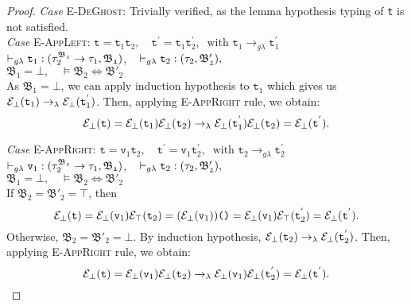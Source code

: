 \begin{proof}
\noindent\textit{Case} \textsc{E-DeGhost}:  \qquad  Trivially verified,
as the lemma hypothesis typing of \texttt{t} is not satisfied.\\

\noindent\textit{Case} \textsc{E-AppLeft}: \qquad 
 $\texttt{t} = \texttt{t}_{1} \texttt{t}_{2},\quad
 \texttt{t}^{'} = \texttt{t}_{1} \texttt{t}^{'}_{2}, ~ \text{ with }
 \texttt{t}_{1} \rightarrow_{g\lambda} \texttt{t}^{'}_{1}$ \\
$\vdash_{g\lambda} \texttt{t}_{1} : (\tau_{2}^{\mathfrak{B_{2}}} \rightarrow \tau_{1}, \mathfrak{B_{1}})$,  ~
$\vdash_{g\lambda} \texttt{t}_{2} : (\tau_{2}, \mathfrak{B'_{2}}), $ \\ 
$ \mathfrak{B_{1}} = \bot,  \quad 
\vDash\mathfrak{B_{2}} \Leftrightarrow \mathfrak{B'_{2}} $ \\

As $\mathfrak{B_{1}} = \bot$, we can apply induction hypothesis to
$\texttt{t}_{1}$ which gives us 
$\mathcal{E}_{\bot}(\texttt{t}_{1}) \rightarrow_{\lambda} 
\mathcal{E}_{\bot}(\texttt{t}_{1}^{'})$.
Then, applying \textsc{E-AppRight} rule, we obtain:
$$
\mathcal{E}_{\bot}(\texttt{t}) 
= \mathcal{E}_{\bot}(\texttt{t}_{1})\mathcal{E}_{\bot}(\texttt{t}_{2})
\rightarrow_{\lambda} 
\mathcal{E}_{\bot}(\texttt{t}^{'}_{1})\mathcal{E}_{\bot}(\texttt{t}_{2})
= \mathcal{E}_{\bot}(\texttt{t}^{'}).$$




\noindent\textit{Case} \textsc{E-AppRight}: \qquad 
 $\texttt{t} = \texttt{v}_{1} \texttt{t}_{2},\quad
 \texttt{t}^{'} = \texttt{v}_{1} \texttt{t}^{'}_{2}, ~ \text{ with }
 \texttt{t}_{2} \rightarrow_{g\lambda} \texttt{t}^{'}_{2}$ \\
$\vdash_{g\lambda} \texttt{v}_{1} : (\tau_{2}^{\mathfrak{B_{2}}} \rightarrow \tau_{1}, \mathfrak{B_{1}})$,  ~
$\vdash_{g\lambda} \texttt{t}_{2} : (\tau_{2}, \mathfrak{B'_{2}}), $ \\ 
$ \mathfrak{B_{1}} = \bot,  \quad 
\vDash\mathfrak{B_{2}} \Leftrightarrow \mathfrak{B'_{2}} $ \\
If $\mathfrak{B_{2}} = \mathfrak{B'_{2}} = \top $, then
$$\mathcal{E}_{\bot}(\texttt{t}) 
= \mathcal{E}_{\bot}(\texttt{v}_{1})\mathcal{E}_{\top}(\texttt{t}_{2})
= (\mathcal{E}_{\bot}(\texttt{v}_{1}))\texttt{()}
= \mathcal{E}_{\bot}(\texttt{v}_{1})\mathcal{E}_{\top}(\texttt{t}^{'}_{2})
= \mathcal{E}_{\bot}(\texttt{t}^{'}). $$
Otherwise, $\mathfrak{B_{2}} = \mathfrak{B'_{2}} = \bot $.
By induction hypothesis, 
$\mathcal{E}_{\bot}(\texttt{t}_{2}) \rightarrow_{\lambda} 
\mathcal{E}_{\bot}(\texttt{t}_{2}^{'})$.
Then, applying \textsc{E-AppRight} rule, we obtain:
$$
\mathcal{E}_{\bot}(\texttt{t}) 
= \mathcal{E}_{\bot}(\texttt{v}_{1})\mathcal{E}_{\bot}(\texttt{t}_{2})
\rightarrow_{\lambda} 
\mathcal{E}_{\bot}(\texttt{v}_{1})\mathcal{E}_{\bot}(\texttt{t}^{'}_{2})
= \mathcal{E}_{\bot}(\texttt{t}^{'}).$$





\end{proof}
